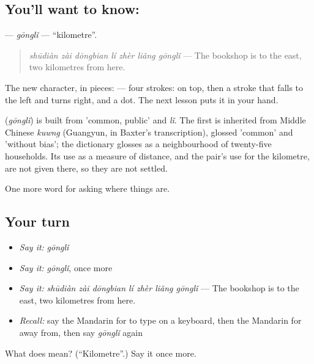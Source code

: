\subsection*{You'll want to know: }
\textbf{} — \emph{gōnglǐ} — \textquotedblleft{}kilometre\textquotedblright{}.

\begin{quote}
\textbf{} \emph{shūdiàn zài dōngbian lí zhèr liǎng gōnglǐ} — The bookshop is to the east, two kilometres from here.
\end{quote}

The new character, in pieces:  — four strokes:  on top, then a stroke that falls to the left and turns right, and a dot. The next lesson puts it in your hand.

\begin{cousinweb}
\textbf{} (\emph{gōnglǐ}) is built from  'common, public' and  \emph{lǐ}. The first is inherited from Middle Chinese \emph{kuwng} (Guangyun, in Baxter's transcription), glossed 'common' and 'without bias'; the dictionary glosses  as a neighbourhood of twenty-five households. Its use as a measure of distance, and the pair's use for the kilometre, are not given there, so they are not settled.
\end{cousinweb}

\begin{grammarlens}[title={What you've built}]
One more word for asking where things are.
\end{grammarlens}

\subsection*{Your turn}
\begin{itemize}
\raggedright
  \item \emph{Say it:} \emph{gōnglǐ}
  \item \emph{Say it:} \emph{gōnglǐ}, once more
  \item \emph{Say it:} \emph{shūdiàn zài dōngbian lí zhèr liǎng gōnglǐ} — The bookshop is to the east, two kilometres from here.
  \item \emph{Recall:} say the Mandarin for to type on a keyboard, then the Mandarin for away from, then say \emph{gōnglǐ} again
\end{itemize}

\begin{tcolorbox}[breakable,colback=teal!4,colframe=teal!35!black,title={Before you move on}]
What does  mean? (\textquotedblleft{}Kilometre\textquotedblright{}.) Say it once more.
\end{tcolorbox}
